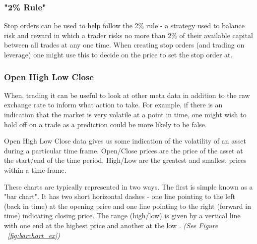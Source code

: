             
            \subsubsection{"2\% Rule"}
            Stop orders can be used to help follow the 2\% rule - a strategy used to balance risk and reward in which a trader risks no more than 2\% of their available capital between all trades at any one time. When creating stop orders (and trading on leverage) one might use this to decide on the price to set the stop order at. \cite{staff_2017}



\iffalse
            \subsubsection{Gold}

            Historically, the value of gold remains stable 

            
            \subsubsection{US Treasury Bonds}
\fi


            
            \subsubsection{Open High Low Close}

            When, trading it can be useful to look at other meta data in addition to the raw exchange rate to inform what action to take. For example, if there is an indication that the market is very volatile at a point in time, one might wish to hold off on a trade as a prediction could be more likely to be false. 
            
            Open High Low Close data gives us some indication of the volatility of an asset during a particular time frame. Open/Close prices are the price of the asset at the start/end of the time period. High/Low are the greatest and smallest prices within a time frame. \cite{investopedia_OHLC}

            These charts are typically represented in two ways. The first is simple known as a "bar chart". It has two short horizontal dashes - one line pointing to the left (back in time) at the opening price and one line pointing to the right (forward in time) indicating closing price. The range (high/low) is given by a vertical line with one end at the highest price and another at the low \cite{barchart_OHLC}. \textit{(See Figure ~\ref{fig:barchart_ex})}


